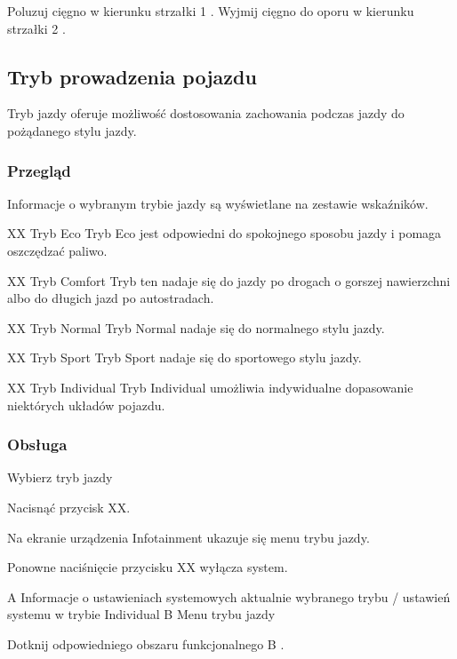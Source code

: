 \begin{itemizeArrow}
	\itemArrow Poluzuj cięgno w kierunku strzałki 1 .
	\itemArrow Wyjmij cięgno do oporu w kierunku strzałki 2 .
\end{itemizeArrow}

\subsection{Tryb prowadzenia pojazdu}

Tryb jazdy oferuje możliwość dostosowania zachowania podczas jazdy do pożądanego stylu jazdy.

\subsubsection{Przegląd}

Informacje o wybranym trybie jazdy są wyświetlane na zestawie wskaźników.

XX Tryb Eco
Tryb Eco jest odpowiedni do spokojnego sposobu jazdy i pomaga oszczędzać paliwo.

XX Tryb Comfort
Tryb ten nadaje się do jazdy po drogach o gorszej nawierzchni albo do długich jazd po autostradach.

XX Tryb Normal
Tryb Normal nadaje się do normalnego stylu jazdy.

XX Tryb Sport
Tryb Sport nadaje się do sportowego stylu jazdy.

XX Tryb Individual
Tryb Individual umożliwia indywidualne dopasowanie niektórych układów pojazdu.

\subsubsection{Obsługa}

Wybierz tryb jazdy

\begin{itemizeArrow}
	\itemArrow Nacisnąć przycisk XX.
\end{itemizeArrow}

Na ekranie urządzenia Infotainment ukazuje się menu trybu jazdy.

Ponowne naciśnięcie przycisku XX wyłącza system.


A Informacje o ustawieniach systemowych aktualnie wybranego trybu / ustawień systemu w trybie Individual
B Menu trybu jazdy

\begin{itemizeArrow}
	\itemArrow Dotknij odpowiedniego obszaru funkcjonalnego B .
\end{itemizeArrow}

